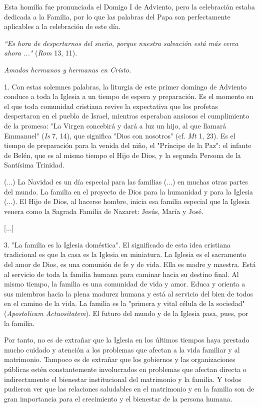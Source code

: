 \begin{body}
Esta homilía fue pronunciada el Domigo I de Adviento, pero la celebración estaba dedicada a la Familia, por lo que las palabras del Papa son perfectamente aplicables a la celebración de este día.

\begin{body} 
\emph{``Es hora de despertarnos del sueño, porque nuestra salvación está más cerca ahora ..."} (\emph{Rom} 13, 11).

\emph{Amados hermanos y hermanas en Cristo.}

1. Con estas solemnes palabras, la liturgia de este primer domingo de Adviento conduce a toda la Iglesia a un tiempo de espera y preparación. Es el momento en el que toda comunidad cristiana revive la expectativa que los profetas despertaron en el pueblo de Israel, mientras esperaban ansiosos el cumplimiento de la promesa: "La Virgen concebirá y dará a luz un hijo, al que llamará Emmanuel" (\emph{Is} 7, 14), que significa "Dios con nosotros" (cf. \emph{Mt} 1, 23). Es el tiempo de preparación para la venida del niño, el "Príncipe de la Paz": el infante de Belén, que es al mismo tiempo el Hijo de Dios, y la segunda Persona de la Santísima Trinidad.

(...) La Navidad es un día especial para las familias (...) en muchas otras partes del mundo. La familia en el proyecto de Dios para la humanidad y para la Iglesia (...). El Hijo de Dios, al hacerse hombre, inicia esa familia especial que la Iglesia venera como la Sagrada Familia de Nazaret: Jesús, María y José.

{[}...{]}

3. "La familia es la Iglesia doméstica". El significado de esta idea cristiana tradicional es que la casa es la Iglesia en miniatura. La Iglesia es el sacramento del amor de Dios, es una comunión de fe y de vida. Ella es madre y maestra. Está al servicio de toda la familia humana para caminar hacia su destino final. Al mismo tiempo, la familia es una comunidad de vida y amor. Educa y orienta a sus miembros hacia la plena madurez humana y está al servicio del bien de todos en el camino de la vida. La familia es la "primera y vital célula de la sociedad" ({\emph{Apostolicam Actuositatem}}). El futuro del mundo y de la Iglesia pasa, pues, por la familia.

Por tanto, no es de extrañar que la Iglesia en los últimos tiempos haya prestado mucho cuidado y atención a los problemas que afectan a la vida familiar y al matrimonio. Tampoco es de extrañar que los gobiernos y las organizaciones públicas estén constantemente involucrados en problemas que afectan directa o indirectamente el bienestar institucional del matrimonio y la familia. Y todos pudieron ver que las relaciones saludables en el matrimonio y en la familia son de gran importancia para el crecimiento y el bienestar de la persona humana.


\end{body}
\end{body}
